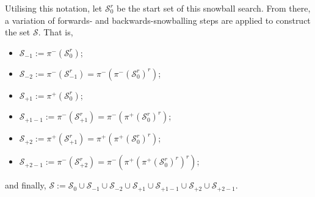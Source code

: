 \documentclass[11pt,a4paper]{book}
\theoremstyle{definition}
\theoremstyle{definition}
\theoremstyle{definition}
\theoremstyle{remark}
\newcommand{\tpset}{\mathcal{S}}
\newcommand{\tpsetz}{\mathcal{S}_{\mathit{0}}}
\newcommand{\pset}{S}
\newcommand{\psetz}{S_{\mathit{0}}}
\newcommand{\xset}{\mathcal{S}}
\newcommand{\xsetz}{\mathcal{S}_{\mathit{0}}}
\newcommand{\xsetb}{\mathcal{S}_{\mathit{-1}}}
\newcommand{\xsetbb}{\mathcal{S}_{\mathit{-2}}}
\newcommand{\xsetf}{\mathcal{S}_{\mathit{+1}}}
\newcommand{\xsetff}{\mathcal{S}_{\mathit{+2}}}
\newcommand{\xsetfb}{\mathcal{S}_{\mathit{+1-1}}}
\newcommand{\xsetffb}{\mathcal{S}_{\mathit{+2-1}}}
\newcommand{\npset}{\overline{\pset}}
\newcommand{\npsetz}{\overline{\psetz}}
\begin{document}
Utilising this notation, let $\xsetz^r$ be the start set of this snowball search. 
From there, a variation of forwards- and backwards-snowballing steps are applied to construct the set $\xset$. That is, 
%
\begin{itemize}
\item $\xsetb:=\pi^-(\xsetz^r)$;
\item $\xsetbb:= \pi^-(\xsetb^r)=\pi^-(\pi^-(\xsetz^r)^r)$;
\item $\xsetf:= \pi^+(\xsetz^r)$;
\item $\xsetfb:= \pi^-(\xsetf^r)=\pi^-(\pi^+(\xsetz^r)^r)$;
\item $\xsetff:= \pi^+(\xsetf^r)= \pi^+(\pi^+(\xsetz^r)^r)$;
\item $\xsetffb:= \pi^-(\xsetff^r)=\pi^-(\pi^+(\pi^+(\xsetz^r)^r)^r)$;
\end{itemize}
and finally, $\xset := \xsetz \cup \xsetb \cup \xsetbb  \cup \xsetf  \cup \xsetfb  \cup \xsetff \cup \xsetffb$.
\end{document}
